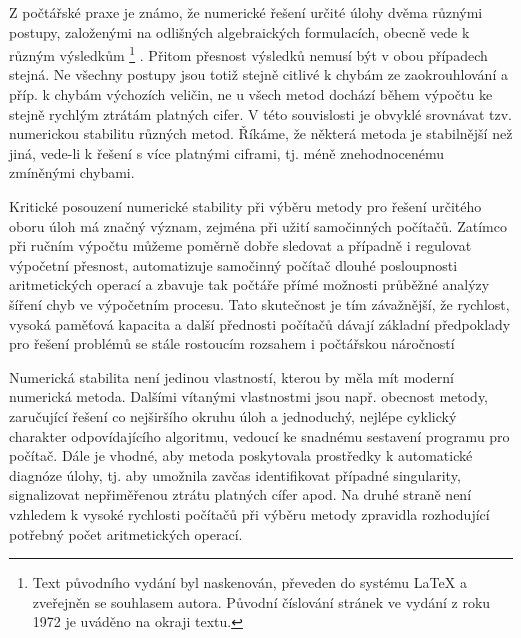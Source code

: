 Z počtářské praxe je známo,
že numerické řešení určité
úlohy dvěma různými postupy, založenými na odlišných algebraických
formulacích, obecně vede k různým
výsledkům%
%
{%
\renewcommand{\thefootnote}{\fnsymbol{footnote}}%
\footnote{Text původního vydání byl naskenován, převeden do systému LaTeX a
zveřejněn se souhlasem autora.
Původní číslování stránek
ve vydání z roku 1972 je uváděno na okraji textu.}%
}.
%
Přitom přesnost
výsledků nemusí být v obou případech stejná. Ne všechny postupy
jsou totiž stejně citlivé k chybám ze zaokrouhlování a příp. k
chybám výchozích veličin, ne u všech metod dochází během výpočtu
ke stejně rychlým ztrátám platných cifer. V této souvislosti
je obvyklé srovnávat tzv. numerickou stabilitu různých metod.
Říkáme, že některá metoda je stabilnější než jiná, vede-li k
řešení s více platnými ciframi, tj. méně znehodnocenému zmíněnými
chybami.

Kritické posouzení numerické stability při výběru metody pro
řešení určitého oboru úloh má značný význam, zejména při užití
samočinných počítačů. Zatímco při ručním výpočtu můžeme poměrně
dobře sledovat a případně i regulovat výpočetní přesnost,
automatizuje samočinný počítač dlouhé posloupnosti aritmetických
operací a zbavuje tak počtáře přímé možnosti průběžné analýzy
šíření chyb ve výpočetním procesu. Tato skutečnost je tím
závažnější, že rychlost, vysoká paměťová kapacita a další přednosti
počítačů dávají základní předpoklady pro řešení problémů se
stále rostoucím rozsahem i počtářskou náročností

Numerická stabilita není jedinou vlastností, kterou by měla
mít moderní numerická metoda. Dalšími vítanými vlastnostmi jsou
např. obecnost metody, zaručující řešení co nejširšího okruhu
úloh a jednoduchý, nejlépe cyklický charakter odpovídajícího
algoritmu, vedoucí ke snadnému sestavení programu pro počítač.
Dále je vhodné, aby metoda poskytovala prostředky k automatické
diagnóze úlohy, tj. aby umožnila zavčas identifikovat případné
singularity, signalizovat nepřiměřenou ztrátu platných cífer
apod. Na druhé straně není vzhledem k vysoké rychlosti počítačů
při výběru metody zpravidla rozhodující potřebný počet
aritmetických operací.

